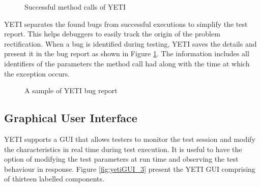 \begin{figure}[h]
	\centering
	\caption{Successful method calls of YETI}
\end{figure}

YETI separates the found bugs from successful executions to simplify the test report. This helps debuggers to easily track the origin of the problem rectification. When a bug is identified during testing, YETI saves the details and present it in the bug report as shown in Figure \ref{bugReport}. The information includes all identifiers of the parameters the method call had along with the time at which the exception occurs.
\bigskip
\begin{figure}[h]
	\centering
	\caption{A sample of YETI bug report}
	\label{bugReport}
\end{figure}

\subsection{Graphical User Interface}
YETI supports a GUI that allows testers to monitor the test session and modify the characteristics in real time during test execution. It is useful to have the option of modifying the test parameters at run time and observing the test behaviour in response. Figure \ref{fig:yetiGUI_3} present the YETI GUI comprising of thirteen labelled components.

